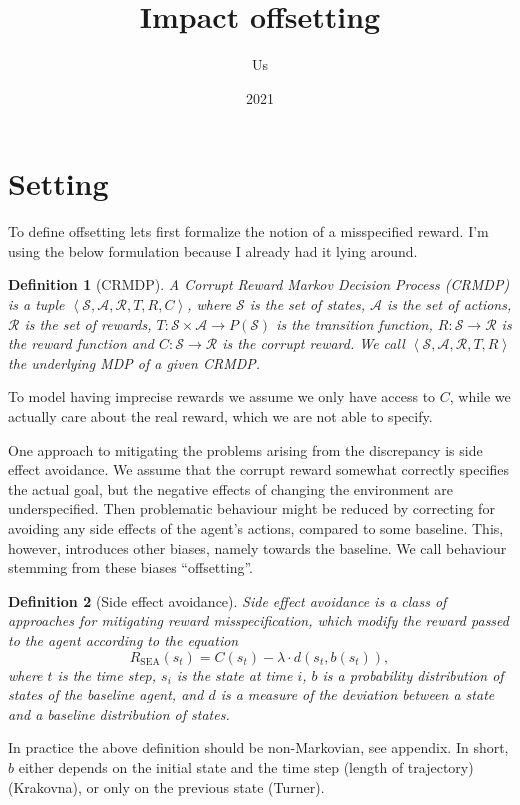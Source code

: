 \documentclass{article}
\title{Impact offsetting}
\author{Us}
\date{2021}
\newtheorem{definition}{Definition}
\newcommand{\stateSpace}{\mathcal{S}}
\newcommand{\actionSpace}{\mathcal{A}}
\newcommand{\rewardSpace}{\mathcal{R}}
\newcommand{\trasitionFunction}{T}
\newcommand{\rewardFunction}{R}
\newcommand{\modifiedRewardFunction}{\rewardFunction_{\mathrm{SEA}}}
\newcommand{\corruption}{C}
\newcommand{\deviationFromBaseline}{d}
\newcommand{\baseline}{b}
\newcommand{\tuple}[1]{\left\langle #1 \right\rangle}
\newcommand{\rawMDP}{\stateSpace, \actionSpace, \rewardSpace, \trasitionFunction, \rewardFunction}
\newcommand{\MDP}{\tuple{\rawMDP}}
\newcommand{\rawCRMDP}{\rawMDP, \corruption}
\newcommand{\CRMDP}{\tuple{\rawCRMDP}}
\begin{document}
\maketitle

\section{Setting}

 To define offsetting lets first formalize the notion of a misspecified reward. I'm using the below formulation because I already had it lying around.

	\begin{definition}[CRMDP]
		A \emph{Corrupt Reward Markov Decision Process} (CRMDP) is a tuple $\CRMDP$, where $\stateSpace$ is the set of states,
		$\actionSpace$ is the set of actions, $\rewardSpace$ is the set of rewards, $\trasitionFunction \colon \stateSpace \times \actionSpace \to P\left( \stateSpace \right)$
		is the transition function, $\rewardFunction \colon \stateSpace \to \rewardSpace$ is the reward function and $\corruption \colon \stateSpace \to \rewardSpace$ is the corrupt
		reward. We call $\MDP$ the \emph{underlying MDP} of a given CRMDP.
		\label{def:CRMDP}
	\end{definition}

	To model having imprecise rewards we assume we only have access to $\corruption$, while we actually care about the real reward, which we are not able to specify.

	One approach to mitigating the problems arising from the discrepancy is side effect avoidance. We assume that the corrupt reward somewhat correctly specifies the actual goal,
	but the negative effects of changing the environment are underspecified. Then problematic behaviour might be reduced by correcting for avoiding any side effects of the agent's
	actions, compared to some baseline. This, however, introduces other biases, namely towards the baseline. We call behaviour stemming from these biases ``offsetting''.

	\begin{definition}[Side effect avoidance]
		\emph{Side effect avoidance} is a class of approaches for mitigating reward misspecification, which
		modify the reward passed to the agent according to the equation
		\begin{equation}
			\modifiedRewardFunction\left(  s_t \right) =
			\corruption\left( s_t \right) -
			\lambda \cdot \deviationFromBaseline\left( s_t, \baseline\left( s_t \right) \right),
			\label{eq:sideEffectAvoidance}
		\end{equation}
		where $t$ is the time step, $s_i$ is the state at time $i$, $\baseline$ is a probability
		distribution of states of the baseline agent, and $\deviationFromBaseline$ is a measure
		of the deviation between a state and a baseline distribution of states.
		\label{def:SEA}
	\end{definition}
	In practice the above definition should be non-Markovian, see appendix.
	In short, $\baseline$ either depends on the initial state and the time step
	(length of trajectory) (Krakovna), or only on the previous state (Turner).
\end{document}
